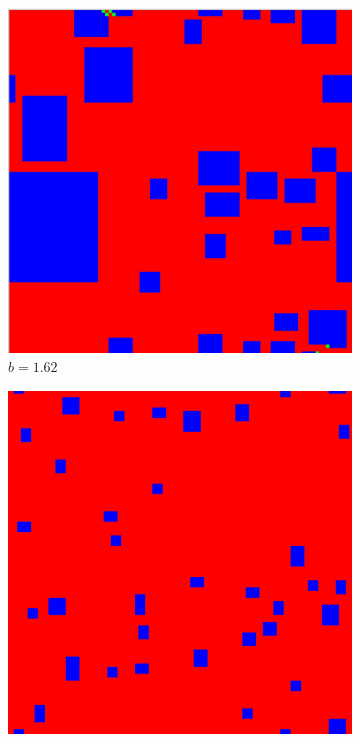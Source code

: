 \documentclass[12pt]{article}
\begin{document}
\begin{figure}[!htbp]
            \begin{subfigure}{.33\textwidth}
            \centering
            \includegraphics[width=.9\linewidth]{MeanFieldGame/snapshot_b=162.jpg}
            \caption{$b=1.62$}
            \label{fig:sub7}
            \end{subfigure}%
            \begin{subfigure}{.33\textwidth}
            \centering
            \includegraphics[width=.9\linewidth]{MeanFieldGame/snapshot_b=17.jpg}

\end{subfigure}
\end{figure}
\end{document}
